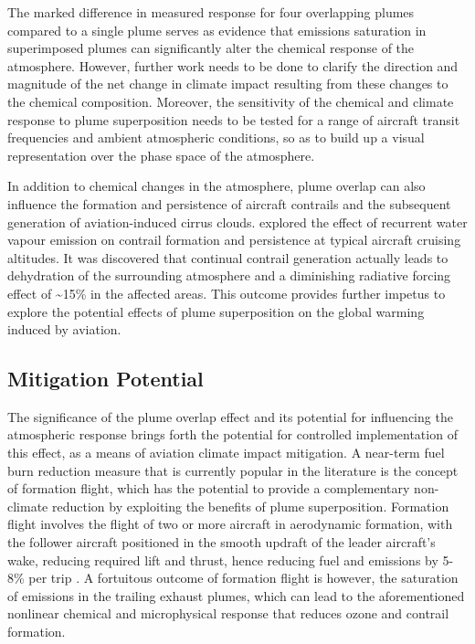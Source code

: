 The marked difference in measured response for four overlapping plumes compared to a single plume serves as evidence that emissions saturation in superimposed plumes can significantly alter the chemical response of the atmosphere. However, further work needs to be done to clarify the direction and magnitude of the net change in climate impact resulting from these changes to the chemical composition. Moreover, the sensitivity of the chemical and climate response to plume superposition needs to be tested for a range of aircraft transit frequencies and ambient atmospheric conditions, so as to build up a visual representation over the phase space of the atmosphere.

In addition to chemical changes in the atmosphere, plume overlap can also influence the formation and persistence of aircraft contrails and the subsequent generation of aviation-induced cirrus clouds. \cite{Schumann2015} explored the effect of recurrent water vapour emission on contrail formation and persistence at typical aircraft cruising altitudes. It was discovered that continual contrail generation actually leads to dehydration of the surrounding atmosphere and a diminishing radiative forcing effect of \textasciitilde15\% in the affected areas. This outcome provides further impetus to explore the potential effects of plume superposition on the global warming induced by aviation.

\subsection{Mitigation Potential}
The significance of the plume overlap effect and its potential for influencing the atmospheric response brings forth the potential for controlled implementation of this effect, as a means of aviation climate impact mitigation. A near-term fuel burn reduction measure that is currently popular in the literature is the concept of formation flight, which has the potential to provide a complementary non- climate reduction by exploiting the benefits of plume superposition.
Formation flight involves the flight of two or more aircraft in aerodynamic formation, with the follower aircraft positioned in the smooth updraft of the leader aircraft's wake, reducing required lift and thrust, hence reducing fuel and  emissions by 5-8\% per trip \cite{Xu2014}. A fortuitous outcome of formation flight is however, the saturation of emissions in the trailing exhaust plumes, which can lead to the aforementioned nonlinear chemical and microphysical response that reduces ozone and contrail formation. 

